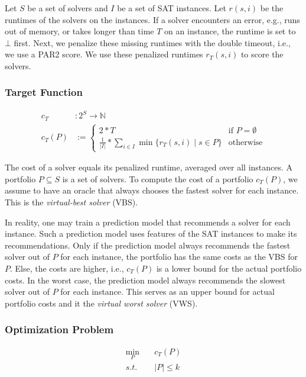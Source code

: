 \documentclass[conference]{IEEEtran}
\begin{document}
Let $S$ be a set of solvers and $I$ be a set of SAT instances.
Let $r(s,i)$ be the runtimes of the solvers on the instances.
If a solver encounters an error, e.g., runs out of memory, or takes longer than time $T$ on an instance, the runtime is set to $\bot$ first.
Next, we penalize these missing runtimes with the double timeout, i.e., we use a PAR2 score.
We use these penalized runtimes $r_T(s,i)$ to score the solvers.

\subsubsection{Target Function}
\label{sec:approach:problem:target}

\begin{align*}
	c_{T} &: 2^S \rightarrow \mathbb{N}\\
	c_{T}(P) &:= \begin{cases}
		2*T & \text{if }P=\emptyset\\
		\frac{1}{|I|} * \sum_{i \in I}{\min\{r_T(s,i) \mid s \in P\}} & \text{otherwise}
	\end{cases} \tag*{Portfolio Cost}
\end{align*}

The cost of a solver equals its penalized runtime, averaged over all instances.
A portfolio $P \subseteq S$ is a set of solvers.
To compute the cost of a portfolio $c_{T}(P)$, we assume to have an oracle that always chooses the fastest solver for each instance.
This is the \emph{virtual-best solver} (VBS).

In reality, one may train a prediction model that recommends a solver for each instance.
Such a prediction model uses features of the SAT instances to make its recommendations.
Only if the prediction model always recommends the fastest solver out of $P$ for each instance, the portfolio has the same costs as the VBS for $P$.
Else, the costs are higher, i.e., $c_{T}(P)$ is a lower bound for the actual portfolio costs.
In the worst case, the prediction model always recommends the slowest solver out of $P$ for each instance.
This serves as an upper bound for actual portfolio costs and it the \emph{virtual worst solver} (VWS).

\subsubsection{Optimization Problem}

\begin{equation}
	\label{eq:small-portfolio-problem}
	\begin{aligned}
		\min_P \quad & c_{T}(P)\\
		s.t. \quad & |P| \leq k
	\end{aligned}
   \tag{Small-Portfolio Problem}
\end{equation}
\end{document}
